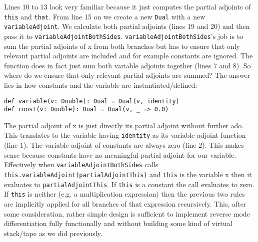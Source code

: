 Lines 10 to 13 look very familiar because it just computes the partial adjoints of \lstinline{this} and \lstinline{that}. From line 15 on we create a new \lstinline{Dual} with a new \lstinline{variableAdjoint}.  We calculate both partial adjoints (lines 19 and 20) and then pass it to \lstinline{variableAdjointBothSides}. \lstinline{variableAdjointBothSides}'s job is to sum the partial adjoints of x from both branches but has to ensure that only relevant partial adjoints are included and for example constants are ignored. The function does in fact just sum both variable adjoints together (lines 7 and 8). So where do we ensure that only relevant partial adjoints are summed? The answer lies in how constants and the variable are instantiated/defined:
\begin{lstlisting}
def variable(v: Double): Dual = Dual(v, identity)
def const(v: Double): Dual = Dual(v, _ => 0.0)
\end{lstlisting}
The partial adjoint of x is just directly its partial adjoint without further ado. This translates to the variable having \lstinline{identity} as its variable adjoint function (line 1). The variable adjoint of constants are always zero (line 2). This makes sense because constants have no meaningful partial adjoint for our variable. Effectively when \lstinline{variableAdjointBothSides} calls \lstinline{this.variableAdjoint(partialAdjointThis)} and \lstinline{this} is the variable x then it evaluates to \lstinline{partialAdjointThis}. If \lstinline{this} is a constant the call evaluates to zero. If \lstinline{this} is neither (e.g. a multiplication expression) then the previous two rules are implicitly applied for all branches of that expression recursively. This, after some consideration, rather simple design is sufficient to implement reverse mode differentiation fully functionally and without building some kind of virtual stack/tape as we did previously.

